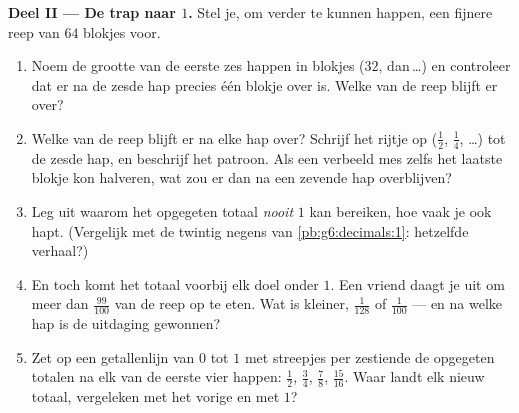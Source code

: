 \begin{problem}
\medskip
\noindent\textbf{Deel II --- De trap naar $1$.}
Stel je, om verder te kunnen happen, een fijnere reep van $64$ blokjes voor.
\begin{enumerate}[resume]
  \item Noem de grootte van de eerste zes happen in blokjes ($32$, dan\,\dots)
        en controleer dat er na de zesde hap precies één blokje over is. Welke
         van de reep blijft er over?
  \item Welke  van de reep blijft er na elke hap over? Schrijf het rijtje
        op ($\frac12$, $\frac14$, \dots) tot de zesde hap, en beschrijf het
        patroon. Als een verbeeld mes zelfs het laatste blokje kon halveren,
        wat zou er dan na een zevende hap overblijven?
  \item Leg uit waarom het opgegeten totaal \emph{nooit} $1$ kan bereiken, hoe
        vaak je ook hapt. (Vergelijk met de twintig negens van
        \cref{pb:g6:decimals:1}: hetzelfde verhaal?)
  \item En toch komt het totaal voorbij elk doel onder $1$. Een vriend daagt je
        uit om meer dan $\frac{99}{100}$ van de reep op te eten. Wat is
        kleiner, $\frac{1}{128}$ of $\frac{1}{100}$ --- en na welke hap is de
        uitdaging gewonnen?
  \item Zet op een getallenlijn van $0$ tot $1$ met streepjes per zestiende de
        opgegeten totalen na elk van de eerste vier happen: $\frac12$,
        $\frac34$, $\frac78$, $\frac{15}{16}$. Waar landt elk nieuw totaal,
        vergeleken met het vorige en met $1$?
\end{enumerate}


\end{problem}
